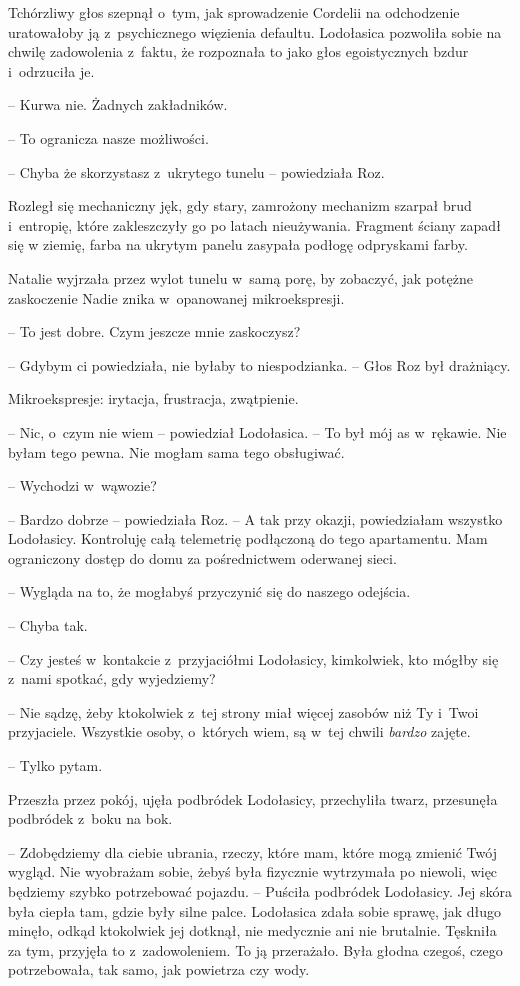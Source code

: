 \documentclass[oneside,polish,11pt,sfheadings]{mwbk}
\begin{document}
Tchórzliwy głos szepnął o~tym, jak sprowadzenie Cordelii na odchodzenie
uratowałoby ją z~psychicznego więzienia defaultu. Lodołasica pozwoliła
sobie na chwilę zadowolenia z~faktu, że rozpoznała to jako głos
egoistycznych bzdur i~odrzuciła je.

-- Kurwa nie. Żadnych zakładników.

-- To ogranicza nasze możliwości.

-- Chyba że skorzystasz z~ukrytego tunelu -- powiedziała Roz. 

Rozległ się
mechaniczny jęk, gdy stary, zamrożony mechanizm szarpał brud i~entropię,
które zakleszczyły go po latach nieużywania. Fragment ściany zapadł się
w ziemię, farba na ukrytym panelu zasypała podłogę odpryskami farby.

Natalie wyjrzała przez wylot tunelu w~samą porę, by zobaczyć, jak
potężne zaskoczenie Nadie znika w~opanowanej mikroekspresji.

-- To jest dobre. Czym jeszcze mnie zaskoczysz?

-- Gdybym ci powiedziała, nie byłaby to niespodzianka. -- Głos Roz był
drażniący.

Mikroekspresje: irytacja, frustracja, zwątpienie.

-- Nic, o~czym nie wiem -- powiedział Lodołasica. -- To był mój as w~rękawie. Nie byłam tego pewna. Nie mogłam sama tego obsługiwać.

-- Wychodzi w~wąwozie?

-- Bardzo dobrze -- powiedziała Roz. -- A tak przy okazji, powiedziałam
wszystko Lodołasicy. Kontroluję całą telemetrię podłączoną do tego
apartamentu. Mam ograniczony dostęp do domu za pośrednictwem oderwanej
sieci.

-- Wygląda na to, że mogłabyś przyczynić się do naszego odejścia.

-- Chyba tak.

-- Czy jesteś w~kontakcie z~przyjaciółmi Lodołasicy, kimkolwiek, kto
mógłby się z~nami spotkać, gdy wyjedziemy?

-- Nie sądzę, żeby ktokolwiek z~tej strony miał więcej zasobów niż Ty i~Twoi przyjaciele. Wszystkie osoby, o~których wiem, są w~tej chwili
\textit{bardzo }zajęte.

-- Tylko pytam.

Przeszła przez pokój, ujęła podbródek Lodołasicy, przechyliła twarz,
przesunęła podbródek z~boku na bok. 

-- Zdobędziemy dla ciebie ubrania,
rzeczy, które mam, które mogą zmienić Twój wygląd. Nie wyobrażam sobie,
żebyś była fizycznie wytrzymała po niewoli, więc będziemy szybko
potrzebować pojazdu. -- Puściła podbródek Lodołasicy. Jej skóra była
ciepła tam, gdzie były silne palce. Lodołasica zdała sobie sprawę, jak
długo minęło, odkąd ktokolwiek jej dotknął, nie medycznie ani nie
brutalnie. Tęskniła za tym, przyjęła to z~zadowoleniem. To ją
przerażało. Była głodna czegoś, czego potrzebowała, tak samo, jak
powietrza czy wody.
\end{document}
